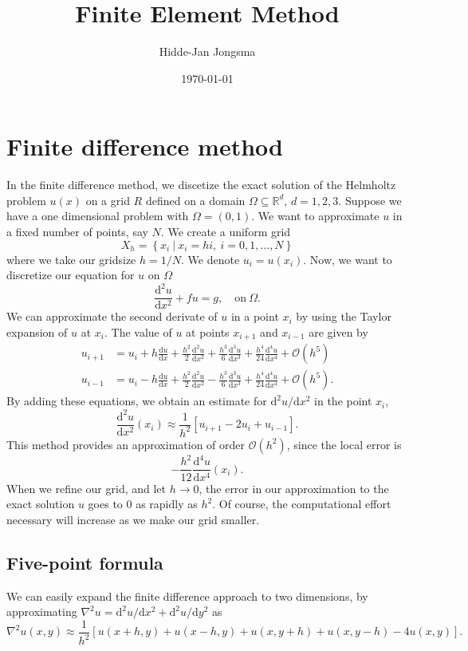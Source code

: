 \documentclass[a4paper]{article}
\author{Hidde-Jan Jongsma}
\title{Finite Element Method}
\date{\today}
\newcommand{\Reals}{\mathbb{R}}
\newcommand{\dd}{\mathrm{d}}
\begin{document}
\section{Finite difference method}

In the finite difference method, we discetize the exact solution of
the Helmholtz problem $u(x)$ on a grid $R$ defined on a domain $\Omega
\subseteq \Reals^d$, $d = 1, 2, 3$. Suppose we have a one dimensional
problem with $\Omega = (0, 1)$. We want to approximate $u$ in a fixed
number of points, say $N$. We create a uniform grid
\begin{equation}
  X_h = \left\{ x_i\ |\ x_i = h i,\ i = 0, 1, \ldots, N \right\}
\end{equation}
where we take our gridsize $h = 1/N$. We denote $u_i = u(x_i)$. Now,
we want to discretize our equation for $u$ on $\Omega$
\begin{equation}
  \frac{\dd^2 u}{\dd x^2} + f u = g, \quad \text{on}\ \Omega.
\end{equation}
We can approximate the second derivate of $u$ in a point $x_i$ by
using the Taylor expansion of $u$ at $x_i$. The value of $u$ at points
$x_{i + 1}$ and $x_{i - 1}$ are given by
\begin{align}
  u_{i + 1} & = u_{i} + h \frac{\dd u}{\dd x}
    + \frac{h^2}{2} \frac{\dd^2 u}{\dd x^2}
    + \frac{h^3}{6} \frac{\dd^3 u}{\dd x^3}
    + \frac{h^4}{24} \frac{\dd^4 u}{\dd x^4} 
    + \mathcal{O}(h^5) \\
%
  u_{i - 1} & = u_{i} - h \frac{\dd u}{\dd x}
    + \frac{h^2}{2} \frac{\dd^2 u}{\dd x^2}
    - \frac{h^3}{6} \frac{\dd^3 u}{\dd x^3}
    + \frac{h^4}{24} \frac{\dd^4 u}{\dd x^4}
    + \mathcal{O}(h^5).
\end{align}
By adding these equations, we obtain an estimate for $\dd^2 u / \dd
x^2$ in the point $x_i$,
\begin{equation}
  \frac{\dd^2 u}{\dd x^2}(x_i)
  \approx
    \frac{1}{h^2} \left[ u_{i + 1} - 2 u_i + u_{i - 1} \right].
\end{equation}
This method provides an approximation of order $\mathcal{O}(h^2)$,
since the local error is
\begin{equation*}
  - \frac{h^2}{12} \frac{\dd^4 u}{\dd x^4}(x_i).
\end{equation*}
When we refine our grid, and let $h \rightarrow 0$, the error in our
approximation to the exact solution $u$ goes to $0$ as rapidly as
$h^2$. Of course, the computational effort necessary will increase as
we make our grid smaller.

\subsection{Five-point formula}

We can easily expand the finite difference approach to two dimensions,
by approximating $\nabla^2 u = \dd^2 u / \dd x^2 + \dd^2 u / \dd y^2$
as
\begin{equation}
  \nabla^2 u(x, y) \approx \frac{1}{h^2} \left[
      u(x + h, y) + u(x - h, y) + u(x, y + h)
      + u(x, y - h) - 4 u(x, y) \right].
\end{equation}
\end{document}
